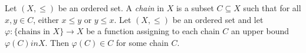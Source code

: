  Let $(X, \leq)$ be an ordered set. A \textit{chain} in $X$ is a subset $C \subseteq X$ such that for all $x, y \in C$, either $x \leq y$ or $y \leq x$.
 Let $(X, \leq)$ be an ordered set and let $\varphi \colon \{ \text{chains in } X \} \to X$ be a function assigning to each chain $C$ an upper bound $\varphi(C) in X$. Then $\varphi(C) \in C$ for some chain $C$.
